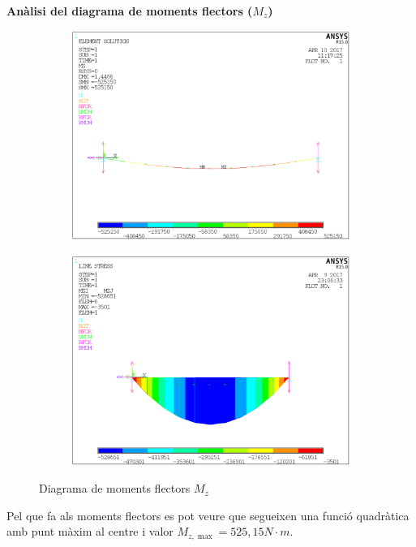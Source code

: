 \documentclass[a4paper]{article}
\def\imgS{0.42\textwidth}
\begin{document}
\textbf{Anàlisi del diagrama de moments flectors ($M_z$)}
\begin{figure}[H]
	\begin{subfigure}{\imgS}
		\includegraphics[width=\textwidth]{images/b_MZ}
	\end{subfigure}
	\hfill
	\begin{subfigure}{\imgS}
		\includegraphics[width=\textwidth]{images/b_MZ_path}
	\end{subfigure}
	\caption{Diagrama de moments flectors $M_z$}
\end{figure}
Pel que fa als moments flectors es pot veure que segueixen una funció quadràtica amb punt màxim al centre i valor $M_{z,\max} = 525,15 N\cdot m$.
\end{document}
